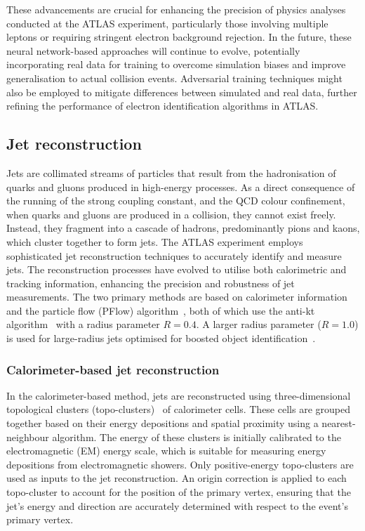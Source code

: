             These advancements are crucial for enhancing the precision of physics analyses conducted at the ATLAS experiment, particularly 
            those involving multiple leptons or requiring stringent electron background rejection. In the future, these neural network-based approaches will 
            continue to evolve, potentially incorporating real data for training to overcome simulation biases and improve generalisation to actual collision 
            events. Adversarial training techniques might also be employed to mitigate differences between simulated and real data, further refining the performance 
            of electron identification algorithms in ATLAS.

    \subsection{Jet reconstruction}
        Jets are collimated streams of particles that result from the hadronisation of quarks and 
        gluons produced in high-energy processes. As a direct consequence of the running of the 
        strong coupling constant, and the QCD colour confinement, when quarks and gluons are produced in a collision, 
        they cannot exist freely. Instead, they fragment into a cascade of hadrons, predominantly 
        pions and kaons, which cluster together to form jets. The ATLAS experiment employs sophisticated 
        jet reconstruction techniques to accurately identify and measure jets. 
        The reconstruction processes have evolved to utilise both calorimetric and tracking information, 
        enhancing the precision and robustness of jet measurements. The two primary methods are based on calorimeter 
        information and the particle flow (PFlow) algorithm~\cite{PERF-2015-09}, both of which use the anti-kt 
        algorithm~\cite{Cacciari:2008gp} with a radius parameter \( R = 0.4 \). A larger radius parameter 
        (\( R = 1.0 \)) is used for large-radius jets optimised for boosted object identification~\cite{JETM-2023-02}.

        \subsubsection{Calorimeter-based jet reconstruction}
            In the calorimeter-based method, jets are reconstructed using three-dimensional topological clusters 
            (topo-clusters)~\cite{PERF-2014-07, JETM-2023-01} of calorimeter cells. These cells are grouped together based on their energy depositions 
            and spatial proximity using a nearest-neighbour algorithm. The energy of these clusters is initially 
            calibrated to the electromagnetic (EM) energy scale, which is suitable for measuring energy depositions from 
            electromagnetic showers. Only positive-energy topo-clusters are used as inputs to the jet reconstruction. 
            An origin correction is applied to each topo-cluster to account for the position of the primary vertex, 
            ensuring that the jet's energy and direction are accurately determined with respect to the event's primary vertex.

